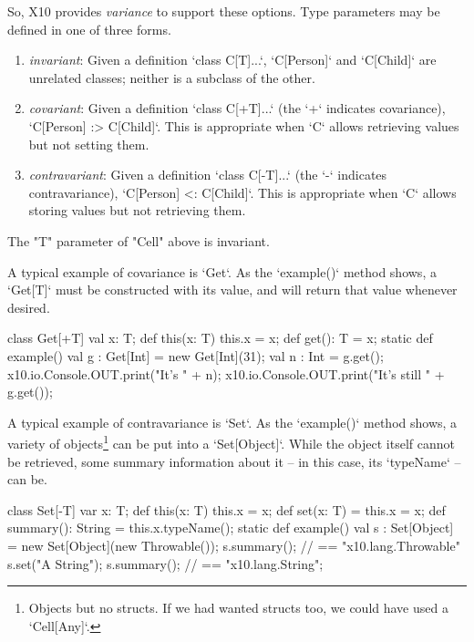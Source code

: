 So, X10 provides {\em variance} to support these options.  Type parameters
may be defined in one of three forms.  
\begin{enumerate}
\item {\em invariant}: Given a definition \xcd`class C[T]{...}`, \xcd`C[Person]` and
      \xcd`C[Child]` are unrelated classes; neither is a subclass of the
      other.
\item {\em covariant}: Given a definition \xcd`class C[+T]{...}` (the \xcd`+` indicates
      covariance), \xcd`C[Person] :> C[Child]`.  This is appropriate when
      \xcd`C` allows retrieving values but not setting them.
\item {\em contravariant}: Given a definition \xcd`class C[-T]{...}` (the \xcd`-` indicates
      contravariance), \xcd`C[Person] <: C[Child]`.  This is appropriate when
      \xcd`C` allows storing values but not retrieving them.
\end{enumerate}


The \xcd"T" parameter of \xcd"Cell" above is
invariant.  

A typical example of covariance is \xcd`Get`.  As the \xcd`example()` method
shows, a \xcd`Get[T]` must be constructed with its value, and will return that
value whenever desired.
\begin{xten}
class Get[+T] {
  val x: T;
  def this(x: T) { this.x = x; }
  def get(): T = x;
  static def example() {
     val g : Get[Int] = new Get[Int](31);
     val n : Int = g.get();
     x10.io.Console.OUT.print("It's " + n);
     x10.io.Console.OUT.print("It's still " + g.get());
  }
}
\end{xten}


A typical example of contravariance is \xcd`Set`.  As the \xcd`example()`
method shows,  a variety of objects\footnote{Objects but no structs.  If we
had wanted structs too, we could have used a \xcd`Cell[Any]`.}  can be put into a
\xcd`Set[Object]`.  While the object itself cannot be retrieved, some summary
information about it -- in this case, its \xcd`typeName` -- can be.  
\begin{xten}
class Set[-T] {
  var x: T;
  def this(x: T) { this.x = x; }
  def set(x: T) = { this.x = x; } 
  def summary(): String = this.x.typeName();
  static def example() {
    val s : Set[Object] = new Set[Object](new Throwable());
    s.summary(); // == "x10.lang.Throwable"
    s.set("A String");
    s.summary(); // == "x10.lang.String";
  }    
}
\end{xten}
%


